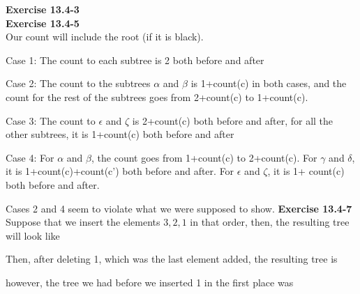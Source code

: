\documentclass{article}
\begin{document}
\noindent\textbf{ Exercise 13.4-3} \\

\noindent\textbf{ Exercise 13.4-5} \\
Our count will include the root (if it is black).

Case 1: The count to each subtree is 2 both before and after

Case 2: The count to the subtrees $\alpha$ and $\beta$ is 1+count(c) in both cases, and the count for the rest of the subtrees goes from 2+count(c) to 1+count(c).

Case 3: The count to $\epsilon$ and $\zeta$ is 2+count(c) both before and after, for all the other subtrees, it is 1+count(c) both before and after

Case 4: For $\alpha$ and $\beta$, the count goes from 1+count(c) to 2+count(c). For $\gamma$ and $\delta$, it is 1+count(c)+count(c') both before and after. For $\epsilon$ and $\zeta$, it is 1+ count(c) both before and after.

Cases 2 and 4 seem to violate what we were supposed to show.
\noindent\textbf{ Exercise 13.4-7} \\
Suppose that we insert the elements $3,2,1$ in that order, then, the resulting tree will look like

Then, after deleting 1, which was the last element added, the resulting tree is 


however, the tree we had before we inserted 1 in the first place was 
\end{document}
